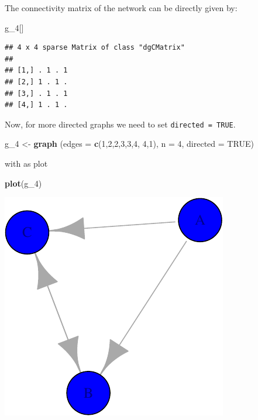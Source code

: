 \documentclass[]{article}
\newenvironment{Shaded}{\begin{snugshade}}{\end{snugshade}}
\newcommand{\KeywordTok}[1]{\textcolor[rgb]{0.13,0.29,0.53}{\textbf{{#1}}}}
\newcommand{\DataTypeTok}[1]{\textcolor[rgb]{0.13,0.29,0.53}{{#1}}}
\newcommand{\DecValTok}[1]{\textcolor[rgb]{0.00,0.00,0.81}{{#1}}}
\newcommand{\StringTok}[1]{\textcolor[rgb]{0.31,0.60,0.02}{{#1}}}
\newcommand{\OtherTok}[1]{\textcolor[rgb]{0.56,0.35,0.01}{{#1}}}
\newcommand{\NormalTok}[1]{{#1}}
\theoremstyle{definition}
\theoremstyle{definition}
\theoremstyle{definition}
\theoremstyle{remark}
\begin{document}
The connectivity matrix of the network can be directly given by:

\begin{Shaded}
\begin{Highlighting}[]
\NormalTok{g_4[]}
\end{Highlighting}
\end{Shaded}

\begin{verbatim}
## 4 x 4 sparse Matrix of class "dgCMatrix"
##             
## [1,] . 1 . 1
## [2,] 1 . 1 .
## [3,] . 1 . 1
## [4,] 1 . 1 .
\end{verbatim}

Now, for more directed graphs we need to set \texttt{directed\ =\ TRUE}.

\begin{Shaded}
\begin{Highlighting}[]
\NormalTok{g_4 <-}\StringTok{ }\KeywordTok{graph} \NormalTok{(}\DataTypeTok{edges =} \KeywordTok{c}\NormalTok{(}\DecValTok{1}\NormalTok{,}\DecValTok{2}\NormalTok{,}\DecValTok{2}\NormalTok{,}\DecValTok{3}\NormalTok{,}\DecValTok{3}\NormalTok{,}\DecValTok{4}\NormalTok{, }\DecValTok{4}\NormalTok{,}\DecValTok{1}\NormalTok{), }\DataTypeTok{n =} \DecValTok{4}\NormalTok{, }\DataTypeTok{directed =} \OtherTok{TRUE}\NormalTok{)}
\end{Highlighting}
\end{Shaded}

with as plot

\begin{Shaded}
\begin{Highlighting}[]
\KeywordTok{plot}\NormalTok{(g_4)}
\end{Highlighting}
\end{Shaded}

\includegraphics{ResearchTools_files/figure-latex/unnamed-chunk-48-1.pdf}
\end{document}
